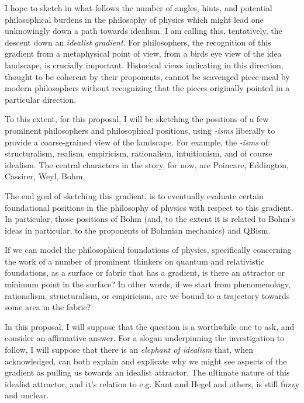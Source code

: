 \documentclass{article}
\begin{document}
I hope to sketch in what follows the number of angles, hints, and potential philosophical burdens in the philosophy of physics which might lead one unknowingly down a path towards idealism.  I am calling this, tentatively, the descent down an \emph{idealist gradient}.  For philosophers, the recognition of this gradient from a metaphysical point of view, from a birds eye view of the idea landscape, is crucially important.  Historical views indicating in this direction, thought to be coherent by their proponents, cannot be scavenged piece-meal by modern philosophers without recognizing that the pieces originally pointed in a particular direction.

To this extent, for this proposal, I will be sketching the positions of a few prominent philosophers and philosophical positions, using \emph{-isms} liberally to provide a coarse-grained view of the landscape.  For example, the \emph{-isms} of: structuralism, realism, empiricism, rationalism, intuitionism, and of course idealism.  The central characters in the story, for now, are Poincare, Eddington, Cassirer, Weyl, Bohm, 

The end goal of sketching this gradient, is to eventually evaluate certain foundational positions in the philosophy of physics with respect to this gradient.  In particular, those positions of Bohm (and, to the extent it is related to Bohm's ideas in particular, to the proponents of Bohmian mechanics) and QBism.  


If we can model the philosophical foundations of physics, specifically concerning the work of a number of prominent thinkers on quantum and relativistic foundations, as a surface or fabric that has a gradient, is there an attractor or minimum point in the surface?  In other words, if we start from phenomenology, rationalism, structuralism, or empiricism, are we bound to a trajectory towards some area in the fabric?  

In this proposal, I will suppose that the question is a worthwhile one to ask, and consider an affirmative answer.  For a slogan underpinning the investigation to follow, I will suppose that there is an \emph{elephant of idealism} that, when acknowledged, can both explain and explicate why we might see aspects of the gradient as pulling us towards an idealist attractor.  The ultimate nature of this idealist attractor, and it's relation to e.g. Kant and Hegel and others, is still fuzzy and unclear.  
\end{document}
